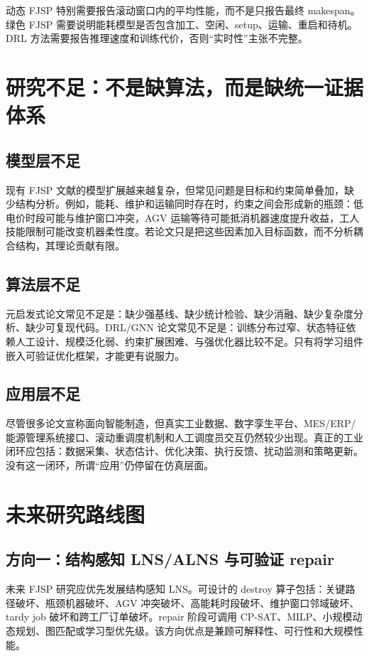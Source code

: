 \documentclass[UTF8,a4paper,11pt]{ctexart}
\begin{document}
动态 FJSP 特别需要报告滚动窗口内的平均性能，而不是只报告最终 makespan。绿色 FJSP 需要说明能耗模型是否包含加工、空闲、setup、运输、重启和待机。DRL 方法需要报告推理速度和训练代价，否则“实时性”主张不完整。

\section{研究不足：不是缺算法，而是缺统一证据体系}

\subsection{模型层不足}

现有 FJSP 文献的模型扩展越来越复杂，但常见问题是目标和约束简单叠加，缺少结构分析。例如，能耗、维护和运输同时存在时，约束之间会形成新的瓶颈：低电价时段可能与维护窗口冲突，AGV 运输等待可能抵消机器速度提升收益，工人技能限制可能改变机器柔性度。若论文只是把这些因素加入目标函数，而不分析耦合结构，其理论贡献有限。

\subsection{算法层不足}

元启发式论文常见不足是：缺少强基线、缺少统计检验、缺少消融、缺少复杂度分析、缺少可复现代码。DRL/GNN 论文常见不足是：训练分布过窄、状态特征依赖人工设计、规模泛化弱、约束扩展困难、与强优化器比较不足。只有将学习组件嵌入可验证优化框架，才能更有说服力。

\subsection{应用层不足}

尽管很多论文宣称面向智能制造，但真实工业数据、数字孪生平台、MES/ERP/能源管理系统接口、滚动重调度机制和人工调度员交互仍然较少出现。真正的工业闭环应包括：数据采集、状态估计、优化决策、执行反馈、扰动监测和策略更新。没有这一闭环，所谓“应用”仍停留在仿真层面。

\section{未来研究路线图}

\subsection{方向一：结构感知 LNS/ALNS 与可验证 repair}

未来 FJSP 研究应优先发展结构感知 LNS。可设计的 destroy 算子包括：关键路径破坏、瓶颈机器破坏、AGV 冲突破坏、高能耗时段破坏、维护窗口邻域破坏、tardy job 破坏和跨工厂订单破坏。repair 阶段可调用 CP-SAT、MILP、小规模动态规划、图匹配或学习型优先级。该方向优点是兼顾可解释性、可行性和大规模性能。
\end{document}
